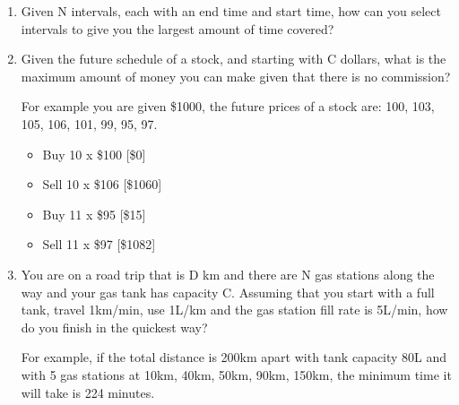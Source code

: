 \documentclass[11pt,oneside]{book}
\begin{document}
\begin{enumerate}
\item Given N intervals, each with an end time and start time, how can you select intervals to give you the largest amount of time covered?
\item Given the future schedule of a stock, and starting with C dollars, what is the maximum amount of money you can make given that there is no commission?

For example you are given \$1000, the future prices of a stock are: 100, 103, 105, 106, 101, 99, 95, 97.

\begin{itemize}
\item Buy 10 x \$100 [\$0]
\item Sell 10 x \$106 [\$1060]
\item Buy 11 x \$95 [\$15]
\item Sell 11 x \$97 [\$1082]
\end{itemize}
\item You are on a road trip that is D km and there are N gas stations along the way and your gas tank has capacity C. Assuming that you start with a full tank, travel 1km/min, use 1L/km and the gas station fill rate is 5L/min, how do you finish in the quickest way?

For example, if the total distance is 200km apart with tank capacity 80L and with 5 gas stations at 10km, 40km, 50km, 90km, 150km, the minimum time it will take is 224 minutes.
\end{enumerate}
\newpage\null\thispagestyle{empty}\newpage
\end{document}

